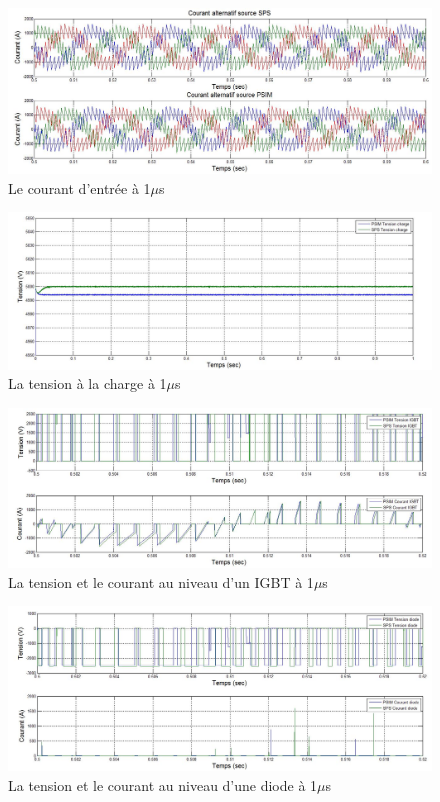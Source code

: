 \documentclass[11pt,letterpaper,final]{report}
\begin{document}
\begin{figure}[htb]
\centering
\includegraphics[scale=0.5]{Fig/AFE3LEVEL/1u/cour_al.jpg}
\caption{Le courant d'entrée à 1$\mu$s}
\label{AF_3_cou}
\end{figure}

\begin{figure}[htb]
\centering
\includegraphics[scale=0.5]{Fig/AFE3LEVEL/1u/vch.jpg}
\caption{La tension à la charge à 1$\mu$s}
\label{AF_3_vch}
\end{figure}


\begin{figure}[htb]
\centering
\includegraphics[scale=0.5]{Fig/AFE3LEVEL/1u/IGBT.jpg}
\caption{La tension et le courant au niveau d'un IGBT à 1$\mu$s}
\label{AF_3_IGBT}
\end{figure}

\begin{figure}[htb]
\centering
\includegraphics[scale=0.5]{Fig/AFE3LEVEL/1u/DIODE.jpg}
\caption{La tension et le courant au niveau d'une diode à 1$\mu$s}
\label{AF_3_DIODE}
\end{figure}
\end{document}
